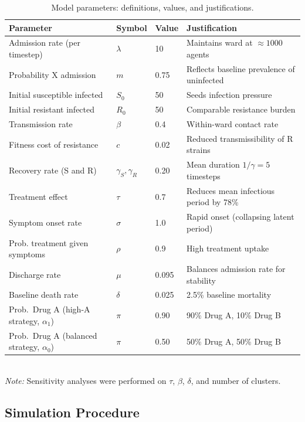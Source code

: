 \documentclass[preprint,11pt]{elsarticle}
\begin{document}
\begin{table}[htbp]
\centering
\caption{Model parameters: definitions, values, and justifications.}
\label{tab:parameters}
\begin{tabular}{llll}
\toprule
\textbf{Parameter} & \textbf{Symbol} & \textbf{Value} & \textbf{Justification} \\
\midrule
Admission rate (per timestep) & $\lambda$ & 10 & Maintains ward at $\approx 1000$ agents \\
Probability X admission & $m$ & 0.75 & Reflects baseline prevalence of uninfected \\
Initial susceptible infected & $S_0$ & 50 & Seeds infection pressure \\
Initial resistant infected & $R_0$ & 50 & Comparable resistance burden \\
Transmission rate & $\beta$ & 0.4 & Within-ward contact rate \\
Fitness cost of resistance & $c$ & 0.02 & Reduced transmissibility of R strains \\
Recovery rate (S and R) & $\gamma_S, \gamma_R$ & 0.20 & Mean duration $1/\gamma = 5$ timesteps \\
Treatment effect & $\tau$ & 0.7 & Reduces mean infectious period by 78\% \\
Symptom onset rate & $\sigma$ & 1.0 & Rapid onset (collapsing latent period) \\
Prob. treatment given symptoms & $\rho$ & 0.9 & High treatment uptake \\
Discharge rate & $\mu$ & 0.095 & Balances admission rate for stability \\
Baseline death rate & $\delta$ & 0.025 & 2.5\% baseline mortality \\
Prob.\ Drug A (high-A strategy, $\alpha_1$) & $\pi$ & 0.90 & 90\% Drug A, 10\% Drug B \\
Prob.\ Drug A (balanced strategy, $\alpha_0$) & $\pi$ & 0.50 & 50\% Drug A, 50\% Drug B \\
\bottomrule
\end{tabular}
\\
\footnotesize
\textit{Note:} Sensitivity analyses were performed on $\tau$, $\beta$, $\delta$, and number of clusters.
\end{table}

\subsection{Simulation Procedure}
\end{document}
